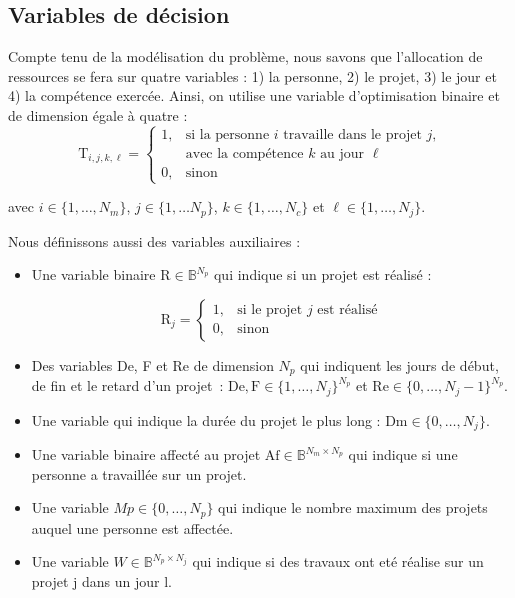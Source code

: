\documentclass[12pt, a4paper, french, version=last, parskip=half, titlepage]{scrartcl}
\begin{document}
\subsection{Variables de décision}

Compte tenu de la modélisation du problème, nous savons que l'allocation de ressources se fera sur quatre variables : 1) la personne, 2) le projet, 3) le jour et 4) la compétence exercée. Ainsi, on utilise une variable d'optimisation binaire et de dimension égale à quatre :
\begin{equation*}
    \text{T}_{i,j,k,\ell} = 
    \begin{cases}
        1, & \text{si la personne $i$ travaille dans le projet $j$,} \\[-0.1em]
           & \text{avec la compétence $k$ au jour $\ell$} \\[0.2em]
        0, & \text{sinon}
    \end{cases}
\end{equation*}

avec $i \in \{1, \dots, N_m\}$, $j \in \{1, \dots N_p\}$, $k \in \{1, \dots, N_c\}$ et $\ell \in \{1, \dots, N_j\}$.

Nous définissons aussi des variables auxiliaires :

\begin{itemize}
    \item Une variable binaire $\text{R} \in \mathbb{B}^{N_p}$ qui indique si un projet est réalisé :
    
        \begin{equation*}
            \text{R}_{j} = 
            \begin{cases}
                1, & \text{si le projet $j$ est réalisé} \\
                0, & \text{sinon}
            \end{cases}
        \end{equation*}
    \item Des variables De, F et Re de dimension $N_p$ qui indiquent les jours de début, de fin et le retard d'un projet~: $\text{De},\text{F} \in \{1, \dots, N_j\}^{N_p}$ et $\text{Re} \in \{0, \dots, N_j-1\}^{N_p}$.
    \item Une variable qui indique la durée du projet le plus long : $\text{Dm} \in \{0, \dots, N_j\}$.
    \item Une variable binaire affecté au projet $\text{Af} \in \mathbb{B}^{N_m \times N_p}$ qui indique si une personne a travaillée sur un projet.
    \item Une variable $Mp \in \{0, \dots, N_p\}$ qui indique le nombre maximum des projets auquel une personne est affectée.
    \item Une variable $W \in \mathbb{B}^{N_p\times N_j}$ qui indique si des travaux ont eté réalise sur un projet j dans un jour l.
\end{itemize}
\end{document}
